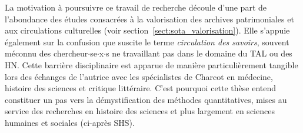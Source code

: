 La motivation à poursuivre ce travail de recherche découle d’une part de l'abondance des études consacrées à la valorisation des archives patrimoniales et aux circulations culturelles (voir section~\ref{sect:sota_valorisation}). Elle s'appuie également sur la confusion que suscite le terme \textit{circulation des savoirs}, souvent méconnu des chercheur$\cdot$se$\cdot$x$\cdot$s ne travaillant pas dans le domaine du \textsc{TAL} ou des \textsc{HN}.
Cette barrière disciplinaire est apparue de manière particulièrement tangible lors des échanges de l’autrice avec les spécialistes de Charcot en médecine, histoire des sciences et critique littéraire. C'est pourquoi cette thèse entend constituer un pas vers la démystification des méthodes quantitatives, mises au service des recherches en histoire des sciences et plus largement en sciences humaines et sociales (ci-après \og{}\textsc{SHS}\fg{}).

